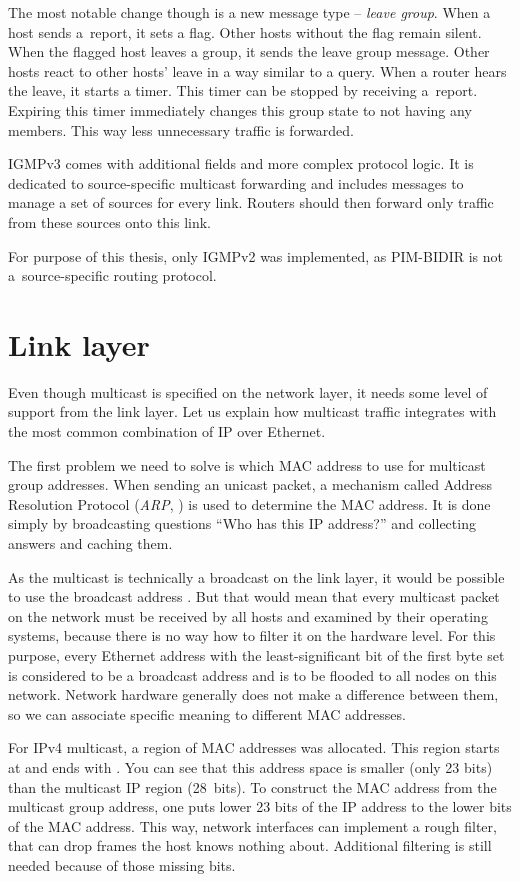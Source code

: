 The most notable change though is a new message type -- \emph{leave group}. When a host
sends a~report, it sets a flag. Other hosts without the flag remain silent. When
the flagged host leaves a group, it sends the leave group message. Other hosts
react to other hosts' leave in a way similar to a query. When a router hears the leave,
it starts a timer. This timer can be stopped by receiving a~report. Expiring this
timer immediately changes this group state to not having any members. This way
less unnecessary traffic is forwarded.

IGMPv3 comes with additional fields and more complex protocol logic. It is
dedicated to source-specific multicast forwarding and includes messages to manage
a set of sources for every link. Routers should then forward only traffic from
these sources onto this link.

For purpose of this thesis, only IGMPv2 was implemented, as PIM-BIDIR is not
a~source-specific routing protocol.

\section{Link layer}

Even though multicast is specified on the network layer, it needs some level of
support from the link layer. Let us explain how multicast traffic integrates with
the most common combination of IP over Ethernet.

The first problem we need to solve is which MAC address to use for multicast
group addresses. When sending an unicast packet, a mechanism called Address
Resolution Protocol (\emph{ARP}, ) is used to determine the MAC
address. It is done simply by broadcasting questions ``Who has this IP
address?'' and collecting answers and caching them.

As the multicast is technically a broadcast on the link layer, it would be possible to
use the broadcast address .
But that would mean that every multicast packet on the network must be received by all
hosts and examined by their operating systems, because there is no way how to filter
it on the hardware level. For this purpose, every Ethernet address with the
least-significant bit of the first byte set is considered to be
a broadcast address and is to be flooded to all nodes on this network. Network
hardware generally does not make a difference between them, so we can associate
specific meaning to different MAC addresses.

For IPv4 multicast, a region of MAC addresses was allocated. This region starts
at  and ends with . You can see
that this address space is smaller (only 23 bits) than the multicast IP region
(28~bits). To construct the MAC address from the multicast group address, one
puts lower 23 bits of the IP address to the lower bits of the MAC address. This
way, network interfaces can implement a rough filter, that can drop frames the
host knows nothing about. Additional filtering is still needed because of those
missing bits.


